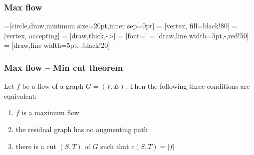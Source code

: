 \begin{frame}[fragile]
\frametitle{Max flow}

=[circle,draw,minimum size=20pt,inner sep=0pt]
 = [vertex, fill=black!80]
 = [vertex, accepting]
 = [draw,thick,->]
 = [font=\small]
 = [draw,line width=5pt,-,red!50]
 = [draw,line width=5pt,-,black!20]

\begin{figure}
\end{figure}

\end{frame}


\begin{frame}[fragile]
\frametitle{Max flow -- Min cut theorem}


Let \(f\) be a flow of a graph \(G=(V,E)\).
Then the following three conditions are equivalent:

\begin{enumerate}
\item
      \(f\) is a maximum flow
\item
      the residual graph has no augmenting path
\item
      there is a cut \((S,T)\) of \(G\) such that \(c(S,T) = |f|\)
\end{enumerate}
\end{frame}

